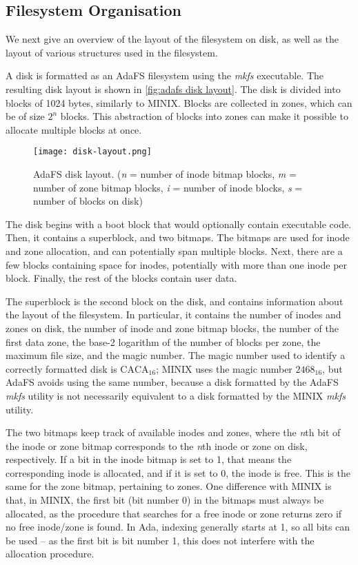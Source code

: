 \subsection{Filesystem Organisation}
We next give an overview of the layout of the filesystem on disk, as well as the layout of various structures used in the filesystem.

A disk is formatted as an AdaFS filesystem using the \textit{mkfs} executable.
The resulting disk layout is shown in \autoref{fig:adafs disk layout}.
The disk is divided into blocks of 1024 bytes, similarly to MINIX.
Blocks are collected in zones, which can be of size $2^n$ blocks.
This abstraction of blocks into zones can make it possible to allocate multiple blocks at once.

\begin{figure}[tb]
  \centering
  \texttt{[image: disk-layout.png]}
  \caption{AdaFS disk layout. (\textit{n} = number of inode bitmap blocks, \textit{m} = number of zone bitmap blocks, \textit{i} = number of inode blocks, \textit{s} = number of blocks on disk)}
  \label{fig:adafs disk layout}
\end{figure}

The disk begins with a boot block that would optionally contain executable code.
Then, it contains a superblock, and two bitmaps.
The bitmaps are used for inode and zone allocation, and can potentially span multiple blocks.
Next, there are a few blocks containing space for inodes, potentially with more than one inode per block.
Finally, the rest of the blocks contain user data.

The superblock is the second block on the disk, and contains information about the layout of the filesystem.
In particular, it contains the number of inodes and zones on disk, the number of inode and zone bitmap blocks, the number of the first data zone, the base-2 logarithm of the number of blocks per zone, the maximum file size, and the magic number.
The magic number used to identify a correctly formatted disk is $\text{CACA}_{16}$; MINIX uses the magic number $2468_{16}$, but AdaFS avoids using the same number, because a disk formatted by the AdaFS \textit{mkfs} utility is not necessarily equivalent to a disk formatted by the MINIX \textit{mkfs} utility.

The two bitmaps keep track of available inodes and zones, where the \textit{n}th bit of the inode or zone bitmap corresponds to the \textit{n}th inode or zone on disk, respectively.
If a bit in the inode bitmap is set to 1, that means the corresponding inode is allocated, and if it is set to 0, the inode is free.
This is the same for the zone bitmap, pertaining to zones.
One difference with MINIX is that, in MINIX, the first bit (bit number 0) in the bitmaps must always be allocated, as the procedure that searches for a free inode or zone returns zero if no free inode/zone is found.
In Ada, indexing generally starts at 1, so all bits can be used -- as the first bit is bit number 1, this does not interfere with the allocation procedure.

